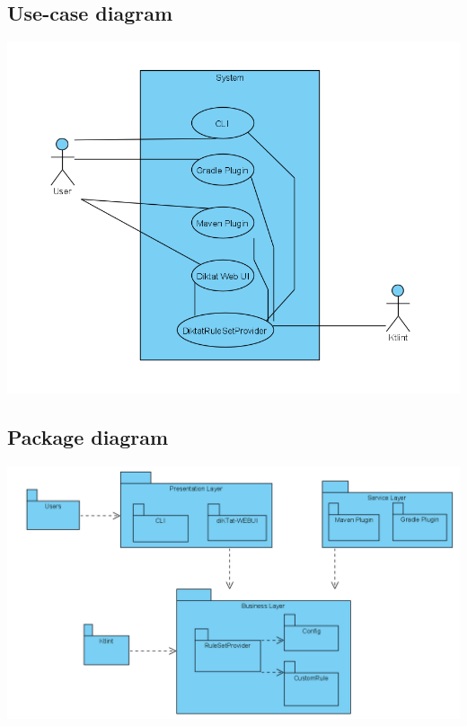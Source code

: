 \subsection{Use-case diagram}
\includegraphics[scale=0.8]{pictures/useCase.png}
\subsection{Package diagram}
\includegraphics[scale=0.65]{pictures/package.png}
